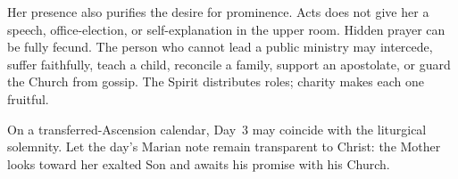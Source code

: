 Her presence also purifies the desire for prominence. Acts does not give her a speech, office-election, or self-explanation in the upper room. Hidden prayer can be fully fecund. The person who cannot lead a public ministry may intercede, suffer faithfully, teach a child, reconcile a family, support an apostolate, or guard the Church from gossip. The Spirit distributes roles; charity makes each one fruitful.

On a transferred-Ascension calendar, Day~3 may coincide with the liturgical solemnity. Let the day's Marian note remain transparent to Christ: the Mother looks toward her exalted Son and awaits his promise with his Church.




